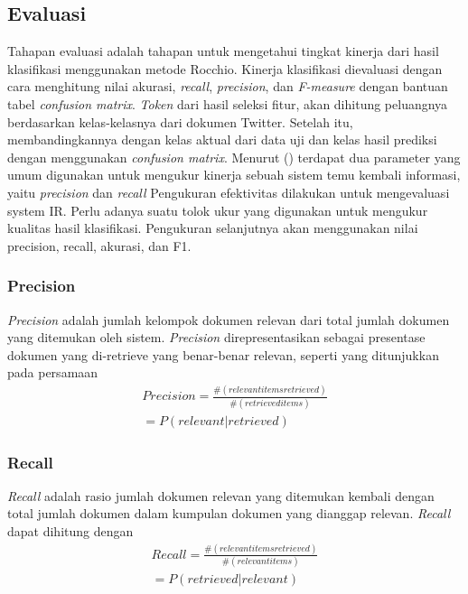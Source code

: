 \subsection*{Evaluasi}
Tahapan evaluasi adalah tahapan untuk mengetahui tingkat kinerja dari hasil klasifikasi menggunakan metode Rocchio. Kinerja klasifikasi dievaluasi dengan cara menghitung nilai akurasi, \textit{recall}, \textit{precision}, dan \textit{F-measure} dengan bantuan tabel \textit{confusion matrix}. \textit{Token} dari hasil seleksi fitur, akan dihitung peluangnya berdasarkan kelas-kelasnya dari dokumen Twitter. Setelah itu, membandingkannya dengan kelas aktual dari data uji dan kelas hasil prediksi dengan menggunakan \textit{confusion matrix}.
Menurut \citeauthor{MANNING2008} (\cite*{MANNING2008}) terdapat dua parameter yang umum digunakan untuk mengukur kinerja sebuah sistem temu kembali informasi, yaitu \textit{precision} dan \textit{recall} Pengukuran efektivitas dilakukan untuk mengevaluasi system IR. Perlu adanya suatu tolok ukur yang digunakan untuk mengukur kualitas hasil klasifikasi. Pengukuran selanjutnya akan menggunakan nilai precision, recall, akurasi, dan F1. 

\subsubsection*{Precision}
\textit{Precision} adalah jumlah kelompok dokumen relevan dari total jumlah dokumen yang  ditemukan oleh sistem. \textit{Precision} direpresentasikan sebagai presentase dokumen yang di-retrieve yang benar-benar relevan, seperti yang ditunjukkan pada persamaan
\begin{equation}
\begin{split}
Precision = \frac{\#(relevant items retrieved)}{\#(retrieved items)} \\ 
= P(relevant|retrieved)
\label{eq:precision}
\end{split}
\end{equation}

\subsubsection*{Recall}
\textit{Recall} adalah rasio jumlah dokumen relevan yang ditemukan kembali dengan total jumlah dokumen dalam kumpulan dokumen yang dianggap relevan. \textit{Recall} dapat dihitung dengan 
\begin{equation}
\begin{split}
Recall = \frac{\#(relevant items retrieved)}{\#(relevant items)} \\ 
= P(retrieved|relevant)
\label{eq:recall}
\end{split}
\end{equation}


